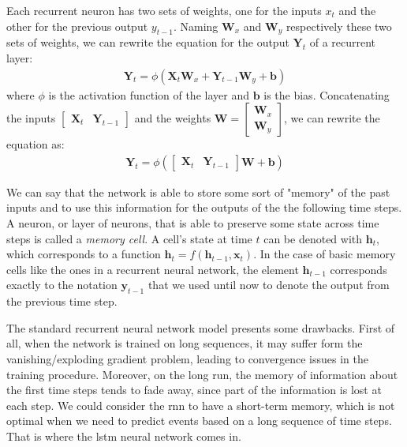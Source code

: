 Each recurrent neuron has two sets of weights, one for the inputs $x_t$ and the other for the previous output $y_{t-1}$. Naming $\mathbf{W}_x$ and $\mathbf{W}_y$ respectively these two sets of weights, we can rewrite the equation for the output $\mathbf{Y}_t$ of a recurrent layer:
\begin{align}
    \mathbf{Y}_t = \phi (\mathbf{X}_t \mathbf{W}_x + \mathbf{Y}_{t-1} \mathbf{W}_y + \mathbf{b})
\end{align}
where $\phi$ is the activation function of the layer and $\mathbf{b}$ is the bias. Concatenating the inputs $[\begin{array}{ll}{\mathbf{X}_t} & {\mathbf{Y}_{t-1}}\end{array}]$ and the weights $\mathbf{W} = \left[\begin{array}{c}{\mathbf{W}_x} \\ {\mathbf{W}_y}\end{array}\right]$, we can rewrite the equation as:
    \begin{align}
        \mathbf{Y}_t = \phi ([\begin{array}{ll}{\mathbf{X}_t} & {\mathbf{Y}_{t-1}}\end{array}] \mathbf{W} + \mathbf{b})
    \end{align}

We can say that the network is able to store some sort of "memory" of the past inputs and to use this information for the outputs of the the following time steps. A neuron, or layer of neurons, that is able to preserve some state across time steps is called a \textit{memory cell}. A cell's state at time $t$ can be denoted with $\mathbf{h}_t$, which corresponds to a function $\mathbf{h}_t = f(\mathbf{h}_{t-1}, \mathbf{x}_t)$. In the case of basic memory cells like the ones in a recurrent neural network, the element $\mathbf{h}_{t-1}$ corresponds exactly to the notation $\mathbf{y}_{t-1}$ that we used until now to denote the output from the previous time step.

The standard recurrent neural network model presents some drawbacks. First of all, when the network is trained on long sequences, it may suffer form the vanishing/exploding gradient problem, leading to convergence issues in the training procedure. Moreover, on the long run, the memory of information about the first time steps tends to fade away, since part of the information is lost at each step. We could consider the \acs{rnn} to have a short-term memory, which is not optimal when we need to predict events based on a long sequence of time steps. That is where the \acs{lstm} neural network comes in.


